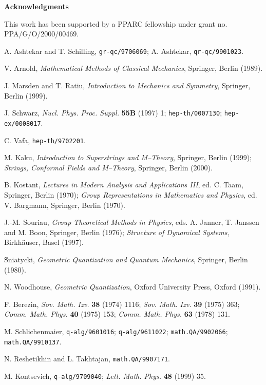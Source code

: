 \documentclass[a4paper,a4paper]{article}
\begin{document}
{\bf Acknowledgments}

This work has been supported by a PPARC fellowship under grant no. 
PPA/G/O/2000/00469.


\begin{thebibliography}{99}

A. Ashtekar and T. Schilling, {\tt gr-qc/9706069};
A. Ashtekar, {\tt qr-qc/9901023}.

V. Arnold, {\it Mathematical Methods of Classical Mechanics}, Springer, Berlin (1989).

J. Marsden and T. Ratiu, {\it Introduction to Mechanics and Symmetry}, Springer, Berlin (1999).

J. Schwarz, {\it Nucl. Phys. Proc. Suppl.} {\bf 55B} (1997) 1;
{\tt hep-th/0007130}; {\tt hep-ex/0008017}.

C. Vafa, {\tt hep-th/9702201}.

M. Kaku, {\it Introduction to Superstrings and M--Theory}, Springer, 
Berlin (1999); {\it Strings, Conformal Fields and M--Theory}, Springer, 
Berlin (2000).

B. Kostant, {\it Lectures in Modern Analysis and Applications III}, ed. C. Taam, 
Springer, Berlin (1970);
{\it Group Representations in Mathematics and Physics}, ed.  V. Bargmann,  Springer, Berlin (1970).

J.-M. Souriau, {\it Group Theoretical Methods in Physics}, eds.  A. Janner, T. Janssen and M.
Boon, Springer, Berlin (1976);
{\it Structure of Dynamical Systems}, Birkh\"auser, Basel (1997).

\`Sniatycki, {\it Geometric Quantization and Quantum Mechanics}, 
Springer, Berlin (1980).

N. Woodhouse, {\it Geometric Quantization}, Oxford University Press, Oxford (1991).

F. Berezin, {\it Sov. Math. Izv.} {\bf 38} (1974) 1116; {\it Sov. Math. Izv.} {\bf 39} (1975) 363;
{\it Comm. Math. Phys.} {\bf 40} (1975) 153;
{\it Comm. Math. Phys.} {\bf 63} (1978) 131.

M. Schlichenmaier, {\tt q-alg/9601016}; {\tt q-alg/9611022};
{\tt math.QA/9902066}; {\tt math.QA/9910137}.

N. Reshetikhin and L. Takhtajan, {\tt math.QA/9907171}.

M. Kontsevich, {\tt q-alg/9709040};  {\it Lett. Math. Phys.} {\bf 48} (1999) 35.


\end{thebibliography}
\end{document}
